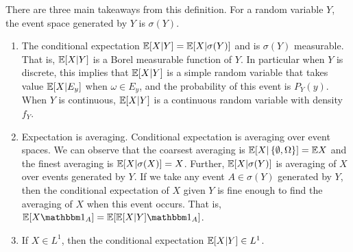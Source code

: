\documentclass[letterpaper,10pt,english]{article}
\begin{document}
\begin{rem} 
There are three main takeaways from this definition. 
For a random variable $Y$, 
the event space generated by $Y$ is $\sigma(Y)$.  
\begin{enumerate}
\item 
The conditional expectation $\mathbb{E}[X|Y] = \mathbb{E}[X|\sigma(Y)]$ and is $\sigma(Y)$ measurable. 
That is, $\mathbb{E}[X|Y]$ is a Borel measurable function of $Y$. 
In particular when $Y$ is discrete, this implies that $\mathbb{E}[X|Y]$ is a simple random variable that takes value $\mathbb{E}[X|E_y]$ when $\omega \in E_y$, and the probability of this event is $P_Y(y)$. 
When $Y$ is continuous, $\mathbb{E}[X|Y]$ is a continuous random variable with density $f_Y$. 

\item Expectation is averaging. 
Conditional expectation is averaging over event spaces. 
We can observe that the coarsest averaging is $\mathbb{E}[X|\left\{\emptyset, \Omega\right\}] = \mathbb{E} X$ 
and the finest averaging is $\mathbb{E}[X|\sigma(X)] = X$. 
Further, $\mathbb{E}[X|\sigma(Y)]$ is averaging of $X$ over events generated by $Y$.   
If we take any event $A \in \sigma(Y)$ generated by $Y$, 
then the conditional expectation of $X$ given $Y$ is fine enough to find the averaging of $X$ when this event occurs.   
That is, $\E[X\Ind{A}] = \E[\E[X|Y]\Ind{A}]$.

\item If $X \in L^1$, then the conditional expectation $\mathbb{E}[X|Y] \in L^1$. 
\end{enumerate}
\end{rem}
\end{document}
